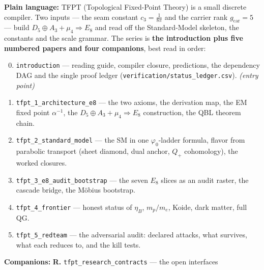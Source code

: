 \begin{navbox}
\textbf{Plain language:} TFPT (Topological Fixed-Point Theory) is a small discrete compiler. Two
inputs --- the seam constant $c_3=\tfrac1{8\pi}$ and the carrier rank $g_{\mathrm{car}}=5$ --- build
$D_5\oplus A_3+\mu_4\Rightarrow E_8$ and read off the Standard-Model skeleton, the constants and the
scale grammar. The series is \textbf{the introduction plus five numbered papers and four companions},
best read in order:
\begin{enumerate}[leftmargin=2.0em,itemsep=1pt,label=\textbf{\arabic*.}]
\setcounter{enumi}{-1}
\item \texttt{introduction} --- reading guide, compiler closure, predictions, the dependency DAG and the
      single proof ledger (\texttt{verification/status\_ledger.csv}). \emph{(entry point)}
\item \texttt{tfpt\_1\_architecture\_e8} --- the two axioms, the derivation map, the EM fixed point
      $\alpha^{-1}$, the $D_5\oplus A_3+\mu_4\Rightarrow E_8$ construction, the QBL theorem chain.
\item \texttt{tfpt\_2\_standard\_model} --- the SM in one $\varphi_0$-ladder formula, flavor from
      parabolic transport (sheet diamond, dual anchor, $Q_+$ cohomology), the worked closures.
\item \texttt{tfpt\_3\_e8\_audit\_bootstrap} --- the seven $E_8$ slices as an audit raster, the cascade
      bridge, the M\"obius bootstrap.
\item \texttt{tfpt\_4\_frontier} --- honest status of $\eta_B$, $m_p/m_e$, Koide, dark matter, full QG.
\item \texttt{tfpt\_5\_redteam} --- the adversarial audit: declared attacks, what survives, what each
      reduces to, and the kill tests.
\end{enumerate}
\noindent\textbf{Companions:} \textbf{R.} \texttt{tfpt\_research\_contracts} --- the open interfaces

\end{navbox}
